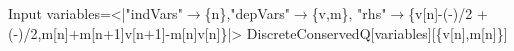 \begin{mmaCell}[moredefined={variables, DiscreteConservedQ}]{Input}
  variables=<|"indVars"\(\pmb{\to}\)\{n\},"depVars"\(\pmb{\to}\)\{v,m\},
  "rhs"\(\pmb{\to}\)\{v[n]-(-)/2
  +(-)/2,m[n]+m[n+1]v[n+1]-m[n]v[n]\}|>
  DiscreteConservedQ[variables][\{v[n],m[n]\}]
  
\end{mmaCell}